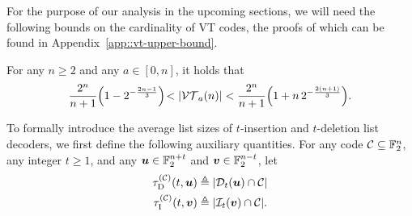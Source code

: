 \documentclass[conference, a4paper]{IEEEtran}
\begin{document}
For the purpose of our analysis in the upcoming sections, we will need
the following bounds on the cardinality of VT codes, the proofs of which can be found in Appendix~\ref{app::vt-upper-bound}.





\begin{lemma} \label{prop::vta-lower bound}\label{lem::vt-bounds}
    For any $n \geq 2$ and any $a \in [0,n]$, it holds that
    \begin{equation*}
        \frac{2^n}{n+1} \parenv*{1-2^{-\frac{2n-1}{3}}} \! < |\vt{a}{n}| < \frac{2^n}{n+1}\parenv*{1 + n\,2^{-\frac{2(n+1)}{3}}}.
    \end{equation*}
\end{lemma}


To formally introduce the average list sizes of $t$-insertion and $t$-deletion list decoders, we first define the following auxiliary quantities. For any code $\mathcal{C} \subseteq \mathbb{F}_2^n$, any integer $t \geq 1$, and any ${\boldsymbol u} \in \mathbb{F}_2^{n+t}$ and ${\boldsymbol v} \in \mathbb{F}_2^{n-t}$, let
\begin{align*}
    \tau_{\mathrm{D}}^{(\mathcal{C})}(t,{\boldsymbol u}) &\triangleq |\mathcal{D}_{t}({\boldsymbol u}) \cap \mathcal{C}| \\
    \tau_{\mathrm{I}}^{(\mathcal{C})}(t,{\boldsymbol v}) &\triangleq |\mathcal{I}_{t}({\boldsymbol v}) \cap \mathcal{C}|.
\end{align*}
\end{document}
